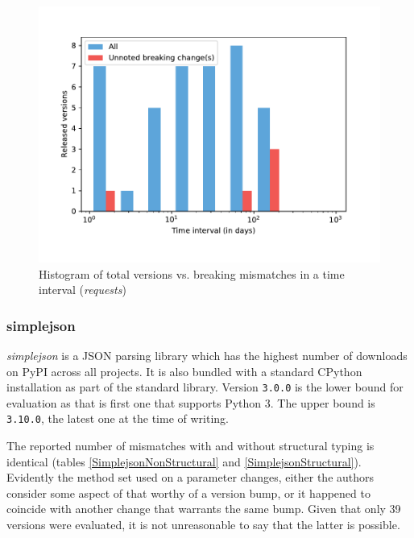 \documentclass{l4proj}
\newcommand\genericstyle{\lstset{basicstyle=\ttm}}
\newcommand\codeinline[1]{{\genericstyle\lstinline!#1!}}
\begin{document}
\begin{figure}[]
\centering
\includegraphics[height=0.4\textheight]{images/evaluation/requests_introduced_changes}
\caption{Histogram of total versions vs. breaking mismatches in a time
interval (\textit{requests})}
\label{RequestsHistogram}
\end{figure}

\subsubsection{simplejson}

\textit{simplejson} is a JSON parsing library which has the highest
number of downloads on PyPI across all projects. It is also bundled
with a standard CPython installation as part of the standard library.
Version \codeinline{3.0.0} is the lower bound for evaluation as that
is first one that supports Python 3. The upper bound is
\codeinline{3.10.0}, the latest one at the time of writing.

The reported number of mismatches with and without structural typing
is identical (tables \ref{SimplejsonNonStructural} and
\ref{SimplejsonStructural}). Evidently the method set used on a
parameter changes, either the authors consider some aspect of that
worthy of a version bump, or it happened to coincide with another
change that warrants the same bump. Given that only 39 versions were
evaluated, it is not unreasonable to say that the latter is possible.
\end{document}
